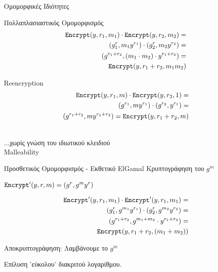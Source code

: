 \documentclass[handout]{beamer}
\begin{document}
\begin{frame}[allowframebreaks]{Ομομορφικές Ιδιότητες}

\begin{block}{Πολλαπλασιαστικός Ομομορφισμός}
\begin{align*}
\mathtt{Encrypt}(y,r_1,m_1) \cdot \mathtt{Encrypt}(y,r_2,m_2) = \\
(g^r_1, m_1 y^{r_1}) \cdot (g^r_2, m_2 y^{r_2}) =\\
(g^{r_1+r_2}, (m_1 \cdot m_2) \cdot y^{r_1+r_2}) = \\
\mathtt{Encrypt}(y, r_1+r_2,m_1  m_2)
\end{align*}
\end{block}

\framebreak

\begin{block}{Reencryption}
\begin{align*}
\mathtt{Encrypt}(y,r_1,m) \cdot \mathtt{Encrypt}(y,r_2,1) = \\
(g^{r_1}, my^{r_1}) \cdot (g^{r_2},  y^{r_1}) =\\
(g^{r_1+r_2}, my^{r_1+r_2}) =
\mathtt{Encrypt}(y,r_1+r_2,m) 
\end{align*}
\end{block}
 \\
\alert{...χωρίς γνώση του ιδιωτικού κλειδιού} \\
\alert{Malleability}

\framebreak

\begin{block}{Προσθετικός Ομομορφισμός - Εκθετικό ElGamal}
Κρυπτογράφηση του $g^m$ 

$\mathtt{Encrypt}'(y,r,m) = (g^r, g^m y^r)$

\begin{align*}
\mathtt{Encrypt}'(y,r_1,m_1) \cdot \mathtt{Encrypt}'(y,r_1,m_1) = \\
(g^r_1, g^{m_1} y^{r_1}) \cdot  (g^r_2, g^{m_2} y^{r_2}) =\\
(g^{r_1+r_2} , g^{m_1 + m_2} \cdot y^{r_1+r_2}) = \\
\mathtt{Encrypt}(y,r_1+r_2,(m_1 + m_2))
\end{align*}

Αποκρυπτογράφηση: Λαμβάνουμε το $g^m$

\alert{Επίλυση 'εύκολου' διακριτού λογαρίθμου}.

\end{block}

\end{frame}
\end{document}
